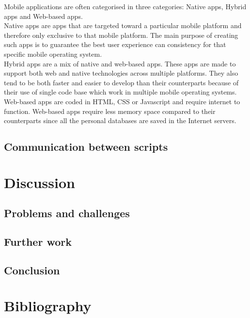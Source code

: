 \documentclass[12pt, letterpaper, twoside]{article}
\begin{document}
Mobile applications are often categorised in three categories: Native apps, Hybrid apps and Web-based apps.\\

Native apps are apps that are targeted toward a particular mobile platform and therefore only exclusive to that mobile platform. The main purpose of creating such apps is to guarantee the best user experience can consistency for that specific mobile operating system.\\

Hybrid apps are a mix of native and web-based apps. These apps are made to support both web and native technologies across multiple platforms. They also tend to be both faster and easier to develop than their counterparts because of their use of single code base which work in multiple mobile operating systems. \\

Web-based apps are coded in HTML, CSS or Javascript and require internet to function. Web-based apps require less memory space compared to their counterparts since all the personal databases are saved in the Internet servers. \\

\subsection{Communication between scripts}

\section{Discussion}
\subsection{Problems and challenges}
\subsection{Further work}
\subsection{Conclusion}

\section{Bibliography}
\end{document}

